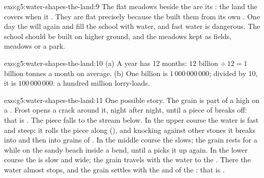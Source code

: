 \begin{solution}{exo:g5:water-shapes-the-land:9}
The flat meadows beside the  are its : the land the 
covers when it . They are flat precisely because the  built them
from its own . One day the  will  again and fill the school
with water, and fast  water is dangerous. The school should be built
on higher ground, and the meadows kept as fields, meadows or a park.
\end{solution}

\begin{solution}{exo:g5:water-shapes-the-land:10}
(a) A year has 12 months: $12$ billion $\div\, 12 = 1$ billion tonnes a month
on average. (b) One billion is $1\,000\,000\,000$; divided by 10, it is
$100\,000\,000$: a hundred million lorry-loads.
\end{solution}

\begin{solution}{exo:g5:water-shapes-the-land:11}
One possible story. The grain is part of a  high on a . Frost
opens a crack around it, night after night, until a piece of  breaks
off: that is . The piece falls to the stream below. In the upper
course the water is fast and steep: it rolls the piece along (), and
knocking against other stones it breaks into  and then into grains of
. In the middle course the  slows; the grain rests for a while on
the sandy beach inside a  bend, until a  picks it up again. In
the lower course the  is slow and wide; the grain travels with the
water to the . There the water almost stops, and the grain settles
with the  and  of the : that is .
\end{solution}

